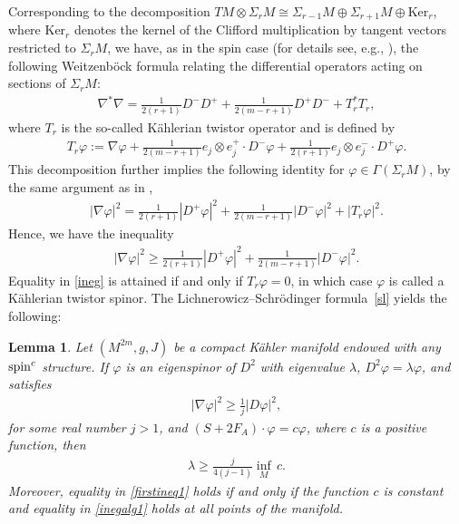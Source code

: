 \documentclass[10pt,a4paper]{amsart}
\numberwithin{equation}{section}
\newtheorem{lem}[thm]{Lemma}
\theoremstyle{definition}
\begin{document}
Corresponding to the decomposition $TM\otimes\Sigma_{r}M\cong \Sigma_{r-1}M\oplus \Sigma_{r+1}M\oplus \mathrm{Ker}_r$,
where $\mathrm{Ker}_r$ denotes the kernel of the Clif\/ford multiplication by tangent vectors restricted to $\Sigma_{r}M$, we have, as in the spin case (for details see, e.g., \cite[equation~(2.7)]{pilcapaper}), the following Weitzenb\"ock formula relating the dif\/ferential operators acting on sections of $\Sigma_{r}M$:
\begin{gather*}%
\nabla^{*}\nabla=\frac{1}{2(r+1)}D^-D^+ +\frac{1}{2(m-r+1)}D^+D^- + T_r^*T_r,
\end{gather*}
where $T_r$ is the so-called K\"ahlerian twistor operator and is def\/ined by
\begin{gather*}
T_r\varphi:= \nabla \varphi +\frac{1}{2(m-r+1)}e_j\otimes e_j^+\cdot D^-\varphi+\frac{1}{2(r+1)}e_j\otimes e_j^-\cdot D^+\varphi.
\end{gather*}
This decomposition further implies the following identity for $\varphi\in\Gamma(\Sigma_{r}M)$, by the same argument as in \cite[Lemma 2.5]{pilcapaper},
\begin{gather}\label{ident}
|\nabla\varphi|^2= \frac{1}{2(r+1)}|D^+\varphi|^2 +\frac{1}{2(m-r+1)}|D^-\varphi|^2+|T_r\varphi|^2.
\end{gather}
Hence, we have the inequality
\begin{gather}\label{ineg}
|\nabla\varphi|^2\geq \frac{1}{2(r+1)}|D^+\varphi|^2 +\frac{1}{2(m-r+1)}|D^-\varphi|^2.
\end{gather}
Equality in \eqref{ineg} is attained if and only if $T_r\varphi=0$, in which case $\varphi$ is called a K\"ahlerian twistor spinor. The Lichnerowicz--Schr\"odinger formula~\eqref{sl} yields the following:
\begin{lem}\label{alg1}
Let $(M^{2m},g,J)$ be a compact K\"ahler manifold endowed with any ${\mathop{\rm spin}^c}$ structure.  If $\varphi$ is an eigenspinor of $D^2$ with eigenvalue $\lambda$, $D^2\varphi=\lambda\varphi$, and satisfies
\begin{gather}\label{inegalg1}
|\nabla\varphi|^2\geq\frac{1}{j}|D\varphi|^2,
\end{gather}
for some real number $j>1$, and  $(S +2 F_A) \cdot \varphi = c \varphi$,
where $c$ is a positive function, then
\begin{gather}\label{firstineq1}
\lambda\geq\frac{j}{4(j-1)}\underset{M}{\inf} \, c.
\end{gather}
Moreover, equality in \eqref{firstineq1}  holds if and only if the function $c$ is constant and equality in \eqref{inegalg1} holds at all points of the manifold.
\end{lem}
\end{document}

